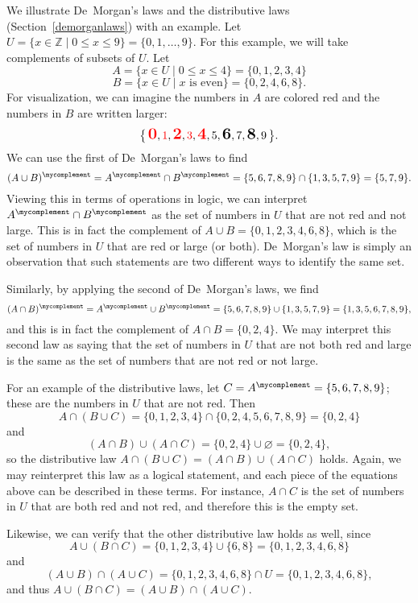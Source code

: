 We illustrate De~Morgan's laws and the distributive laws
(Section~\ref{demorganlaws})
with an example.
Let $U = \{ x \in \mathbb{Z} \mid 0 \leq x \leq 9 \} = \{0,1, \dots, 9\}$.
For this example, we will take complements of subsets of $U$.
Let
\[A = \{ x \in U \mid 0 \leq x \leq 4 \} = \{ 0, 1, 2, 3, 4 \}\]
\[B = \{ x \in U \mid x \text{ is even}\} = \{0,2,4,6,8\}.\]
For visualization, we can imagine the numbers in $A$ are colored red and the numbers in $B$ are written larger:
\[
\big\{\,
\textcolor{red}{\Large \textbf{0}},\textcolor{red}{1},\textcolor{red}{\Large\textbf{2}},\textcolor{red}{3},\textcolor{red}{\Large\textbf{4}},5,\textbf{\Large6},7,\textbf{\Large8},9
\,\big\}.
\]
We can use the first of De~Morgan's laws to find
\[
(A \cup B)^\mycomplement = A^\mycomplement \cap B^\mycomplement = \{ 5,6,7,8,9 \} \cap \{ 1,3,5,7,9 \} = \{ 5,7,9 \}.
\]
Viewing this in terms of operations in logic, we can interpret $A^\mycomplement \cap B^\mycomplement$ as the set of numbers in $U$ that are not red and not large.
This is in fact the complement of $A \cup B = \{ 0,1,2,3,4,6,8 \}$, which is the set of numbers in $U$ that are red or large (or both).
De~Morgan's law is simply an observation that such statements are two different ways to identify the same set.

Similarly, by applying the second of De~Morgan's laws, we find
\[
(A \cap B)^\mycomplement = A^\mycomplement \cup B^\mycomplement = \{ 5,6,7,8,9 \} \cup \{ 1,3,5,7,9 \} = \{ 1,3,5,6,7,8,9 \},
\]
and this is in fact the complement of $A \cap B = \{ 0,2,4 \}$.
We may interpret this second law as saying that the set of numbers in $U$ that are not both red and large is the same as the set of numbers that are not red or not large.

For an example of the distributive laws, let $C = A^\mycomplement = \{ 5,6,7,8,9 \}$; these are the numbers in $U$ that are not red.
Then
\[
A \cap (B \cup C) = \{ 0,1,2,3,4 \} \cap \{ 0,2,4,5,6,7,8,9 \} = \{ 0,2,4 \}
\]
and
\[
(A \cap B)\cup(A \cap C) = \{ 0,2,4 \} \cup \varnothing = \{ 0,2,4 \},
\]
so the distributive law $A \cap (B \cup C) = (A \cap B)\cup(A \cap C)$ holds.
Again, we may reinterpret this law as a logical statement, and each piece of the equations above can be described in these terms.
For instance, $A \cap C$ is the set of numbers in $U$ that are both red and not red, and therefore this is the empty set.


Likewise, we can verify that the other distributive law holds as well, since
\[
A \cup (B \cap C) = \{ 0,1,2,3,4 \} \cup \{ 6,8 \} = \{ 0,1,2,3,4,6,8 \}
\]
and
\[
(A \cup B)\cap(A \cup C) = \{0,1,2,3,4,6,8\} \cap U = \{0,1,2,3,4,6,8\},
\]
and thus $A \cup (B \cap C) = (A \cup B)\cap(A \cup C)$.



